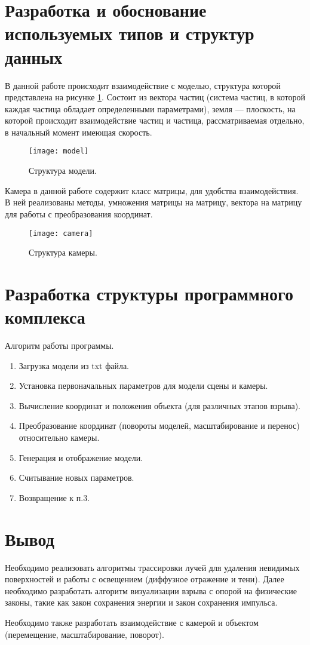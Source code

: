 \section{\textbf{Разработка и обоснование используемых типов и структур данных }}

В данной работе происходит взаимодействие с моделью, структура которой представлена на рисунке \ref{img:model}. Состоит из вектора частиц (система частиц, в которой каждая частица обладает определенными параметрами), земля --- плоскость, на которой происходит взаимодействие частиц и частица, рассматриваемая отдельно, в начальный момент имеющая скорость. 

\begin{figure}[H]
	\centering
	\texttt{[image: model]}
	\caption{Структура модели. }
	\label{img:model}
\end{figure}

Камера в данной работе содержит класс матрицы, для удобства взаимодействия. В ней реализованы методы, умножения матрицы на матрицу, вектора на матрицу для работы с преобразования координат. 

\begin{figure}[H]
	\centering
	\texttt{[image: camera]}
	\caption{Структура камеры. }
	\label{img:camera}
\end{figure}

\section{\textbf{Разработка структуры программного комплекса}}
\hfill

Алгоритм работы программы. 
\begin{enumerate}
	\item[1. ] Загрузка модели из txt файла.
	\item[2. ] Установка первоначальных параметров для модели сцены и камеры. 
	\item[3. ] Вычисление координат и положения объекта (для различных этапов взрыва). 
	\item[4. ] Преобразование координат (повороты моделей, масштабирование и перенос) относительно камеры.
	\item[5. ] Генерация и отображение модели. 
	\item[6. ] Считывание новых параметров. 
	\item[7. ] Возвращение к п.3. 
\end{enumerate}

\section{\textbf{Вывод}}

\hfill

Необходимо реализовать алгоритмы трассировки лучей для удаления невидимых поверхностей и работы с освещением (диффузное отражение и тени). Далее необходимо разработать алгоритм визуализации взрыва с опорой на физические законы, такие как закон сохранения энергии и закон сохранения импульса. 

Необходимо также разработать взаимодействие с камерой и объектом (перемещение, масштабирование, поворот). 
